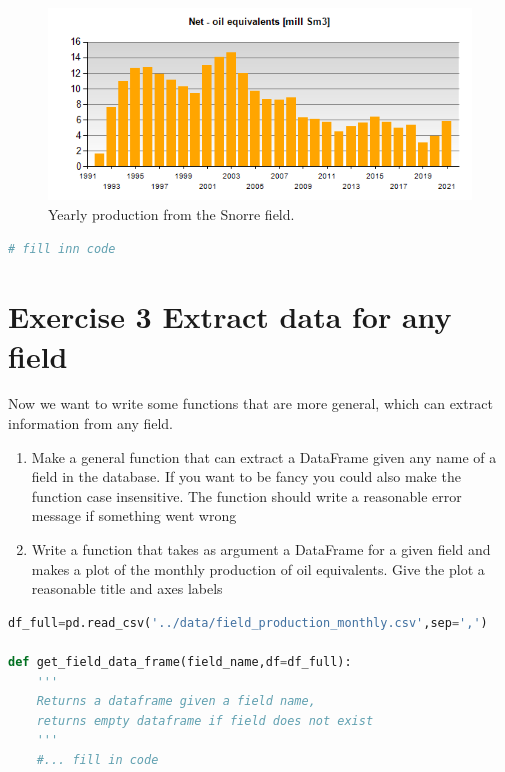 \documentclass[%
twoside,                 %
final,                   %
10pt]{article}
\begin{document}
\noindent
\begin{figure}[!ht]  %
  \centerline{\includegraphics[width=1.0\linewidth]{fig-pandas/snorre.png}}
  \caption{
  Yearly production from the Snorre field. \label{fig:snorre}
  }
\end{figure}



\begin{lstlisting}[language=Python,style=blue1bar]
# fill inn code

\end{lstlisting}


\section{Exercise 3 Extract data for any field}
Now we want to write some functions that are more general, which can extract information from any field.
\begin{enumerate}
\item Make a general function that can extract a DataFrame given any name of a field in the database. If you want to be fancy you could also make the function case insensitive. The function should write a reasonable error message if something went wrong

\item Write a function that takes as argument a DataFrame for a given field and makes a plot of the monthly production of oil equivalents. Give the plot a reasonable title and axes labels
\end{enumerate}

\noindent










\begin{lstlisting}[language=Python,style=blue1bar]
df_full=pd.read_csv('../data/field_production_monthly.csv',sep=',')

def get_field_data_frame(field_name,df=df_full):
    '''
    Returns a dataframe given a field name, 
    returns empty dataframe if field does not exist 
    '''
    #... fill in code 
    

\end{lstlisting}
\end{document}
